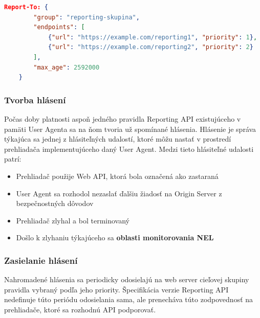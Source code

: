 \begin{center}
\centering
\begin{lstlisting}[caption={\centering Príklad obsahu hlavičky \code{Report-To}. Pravidlo tu definuje skupinu s názvom \code{reporting-skupina}, ku ktorej prislúchajú dva web servery, kam môžu byť hlásenia zasielané s rozdielnou prioritou. Doba platnosti pravidla je 2 592 000 sekúnd, teda 30 dní.},
label=listing:priklad-report-to, 
language=json, 
frame=tb,
xleftmargin=.04\textwidth, 
xrightmargin=.04\textwidth]
    Report-To: {
        "group": "reporting-skupina",
        "endpoints": [
            {"url": "https://example.com/reporting1", "priority": 1},
            {"url": "https://example.com/reporting2", "priority": 2}
        ],
        "max_age": 2592000
    }
\end{lstlisting}
\end{center}


\subsubsection{Tvorba hlásení}

Počas doby platnosti aspoň jedného pravidla Reporting API existujúceho v pamäti 
User Agenta sa na ňom tvoria už spomínané hlásenia.
Hlásenie je správa týkajúca sa jednej z hlásiteľných udalostí, ktoré môžu nastať v prostredí prehliadača implementujúceho daný User Agent.
Medzi tieto hlásiteľné udalosti patrí: 
\begin{itemize}
    \item Prehliadač použije Web API, ktorá bola označená ako zastaraná
    \item User Agent sa rozhodol nezaslať ďalšiu žiadosť na Origin Server z bezpečnostných dôvodov
    \item Prehliadač zlyhal a bol terminovaný
    \item Došlo k zlyhaniu týkajúceho sa \textbf{oblasti monitorovania NEL}
\end{itemize}


\subsubsection{Zasielanie hlásení}

Nahromadené hlásenia sa periodicky odosielajú na web server cieľovej skupiny  pravidla vybraný podľa jeho priority.
Špecifikácia verzie  Reporting API nedefinuje túto periódu odosielania sama, ale prenecháva túto zodpovednosť na prehliadače, ktoré sa rozhodnú API podporovať.

